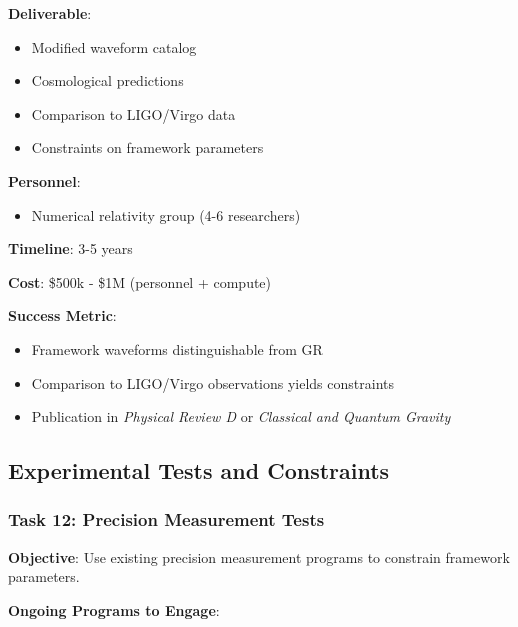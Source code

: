 \textbf{Deliverable}:
\begin{itemize}
    \item Modified waveform catalog
    \item Cosmological predictions
    \item Comparison to LIGO/Virgo data
    \item Constraints on framework parameters
\end{itemize}

\textbf{Personnel}:
\begin{itemize}
    \item Numerical relativity group (4-6 researchers)
\end{itemize}

\textbf{Timeline}: 3-5 years

\textbf{Cost}: \$500k - \$1M (personnel + compute)

\textbf{Success Metric}:
\begin{itemize}
    \item Framework waveforms distinguishable from GR
    \item Comparison to LIGO/Virgo observations yields constraints
    \item Publication in \textit{Physical Review D} or \textit{Classical and Quantum Gravity}
\end{itemize}

\subsection{Experimental Tests and Constraints}

\subsubsection{Task 12: Precision Measurement Tests}

\textbf{Objective}: Use existing precision measurement programs to constrain framework parameters.

\textbf{Ongoing Programs to Engage}:

